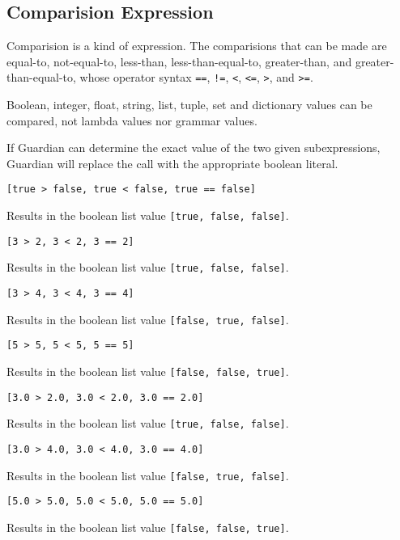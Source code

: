 
\subsection{Comparision Expression}
{
	Comparision is a kind of expression. The comparisions that can be made
	are equal-to, not-equal-to,
	less-than, less-than-equal-to,
	greater-than, and greater-than-equal-to,
	whose operator syntax
	\texttt{==}, \texttt{!=},
	\texttt{<}, \texttt{<=},
	\texttt{>}, and \texttt{>=}.
	
	Boolean, integer, float, string, list, tuple, set and dictionary values
	can be compared, not lambda values nor grammar values.
	
	If Guardian can determine the exact value of the two given subexpressions,
	Guardian will replace the call with the appropriate boolean literal.
	
	\begin{itemize}
	{
		\item[] \texttt{[true > false, true < false, true == false]}
		
			Results in the boolean list value \texttt{[true, false, false]}.
			
		\item[] \texttt{[3 > 2, 3 < 2, 3 == 2]}
		
			Results in the boolean list value \texttt{[true, false, false]}.
			
		\item[] \texttt{[3 > 4, 3 < 4, 3 == 4]}
		
			Results in the boolean list value \texttt{[false, true, false]}.
			
		\item[] \texttt{[5 > 5, 5 < 5, 5 == 5]}
		
			Results in the boolean list value \texttt{[false, false, true]}.
			
		\item[] \texttt{[3.0 > 2.0, 3.0 < 2.0, 3.0 == 2.0]}
		
			Results in the boolean list value \texttt{[true, false, false]}.
			
		\item[] \texttt{[3.0 > 4.0, 3.0 < 4.0, 3.0 == 4.0]}
		
			Results in the boolean list value \texttt{[false, true, false]}.
			
		\item[] \texttt{[5.0 > 5.0, 5.0 < 5.0, 5.0 == 5.0]}
		
			Results in the boolean list value \texttt{[false, false, true]}.
			
}
\end{itemize}}
